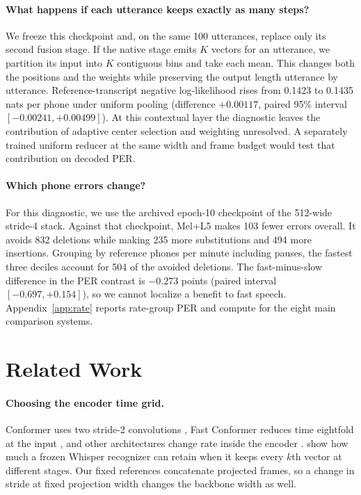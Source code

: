 \documentclass[11pt]{article}
\begin{document}
\paragraph{What happens if each utterance keeps exactly as many steps?}
We freeze this checkpoint and, on the same 100 utterances, replace only its second fusion stage. If the native stage emits $K$ vectors for an utterance, we partition its input into $K$ contiguous bins and take each mean. This changes both the positions and the weights while preserving the output length utterance by utterance. Reference-transcript negative log-likelihood rises from 0.1423 to 0.1435 nats per phone under uniform pooling (difference $+0.00117$, paired 95\% interval $[-0.00241,+0.00499]$). At this contextual layer the diagnostic leaves the contribution of adaptive center selection and weighting unresolved. A separately trained uniform reducer at the same width and frame budget would test that contribution on decoded PER.

\paragraph{Which phone errors change?}
For this diagnostic, we use the archived epoch-10 checkpoint of the 512-wide stride-4 stack. Against that checkpoint, Mel+L5 makes 103 fewer errors overall. It avoids 832 deletions while making 235 more substitutions and 494 more insertions. Grouping by reference phones per minute including pauses, the fastest three deciles account for 504 of the avoided deletions. The fast-minus-slow difference in the PER contrast is $-0.273$ points (paired interval $[-0.697,+0.154]$), so we cannot localize a benefit to fast speech. Appendix~\ref{app:rate} reports rate-group PER and compute for the eight main comparison systems.

\section{Related Work}
\paragraph{Choosing the encoder time grid.}
Conformer uses two stride-2 convolutions \citep{gulati20_interspeech}, Fast Conformer reduces time eightfold at the input \citep{rekesh-etal-2023-fast}, and other architectures change rate inside the encoder \citep{wang-etal-2024-massive,yao-etal-2024-zipformer}. \citet{cho-etal-2026-stride} show how much a frozen Whisper recognizer can retain when it keeps every $k$th vector at different stages. Our fixed references concatenate projected frames, so a change in stride at fixed projection width changes the backbone width as well.
\end{document}
